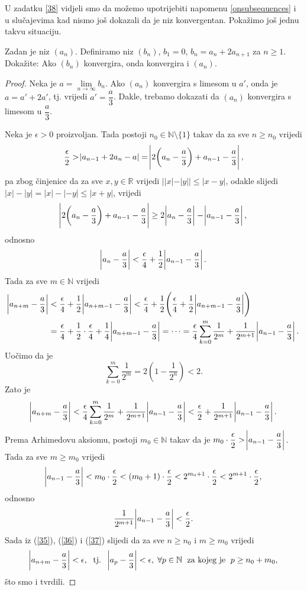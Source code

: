 U zadatku \ref{38} vidjeli smo da možemo upotrijebiti napomenu \ref{onsubsequences} i u slučajevima kad nismo još dokazali da je niz konvergentan. Pokažimo još jednu takvu situaciju.
\begin{exercise}
\label{iteration}
Zadan je niz $(a_n)$. Definiramo niz $(b_n)$, $b_1=0$, $b_n=a_{n}+2a_{n+1}$ za $n\geq 1$. Dokažite: Ako $(b_n)$ konvergira, onda konvergira i $(a_n)$.
\end{exercise}
\begin{proof}
Neka je $a=\lim\limits_{n\to \infty}{b_n}$. Ako $(a_n)$ konvergira s limesom u $a'$, onda je $a=a'+2a'$, tj. vrijedi $a'=\dfrac{a}{3}$. Dakle, trebamo dokazati da $(a_n)$ konvergira s limesom u $\dfrac{a}{3}$.

Neka je $\epsilon>0$ proizvoljan. Tada postoji $n_0\in \mathbb{N}\setminus\{1\}$ takav da za sve $n\geq n_0$ vrijedi
\begin{gather}
\label{35}
\dfrac{\epsilon}{2}>\abs{a_{n-1}+2a_n-a}=\abs{2\left(a_n-\dfrac{a}{3}\right)+a_{n-1}-\dfrac{a}{3}},
\end{gather}
pa zbog činjenice da za sve $x, y\in \mathbb{R}$ vrijedi $||x|-|y||\leq |x-y|$, odakle slijedi $|x|-|y|=|x|-|-y|\leq |x+y|$, vrijedi
$$\abs{2\left(a_n-\dfrac{a}{3}\right)+a_{n-1}-\dfrac{a}{3}}\geq 2\abs{a_n-\dfrac{a}{3}}-\abs{a_{n-1}-\dfrac{a}{3}},$$
odnosno
$$\abs{a_n-\dfrac{a}{3}}<\dfrac{\epsilon}{4}+\dfrac{1}{2}\abs{a_{n-1}-\dfrac{a}{3}}.$$
Tada za sve $m\in \mathbb{N}$ vrijedi
\begin{align*}
\abs{a_{n+m}-\dfrac{a}{3}}&<\dfrac{\epsilon}{4}+\dfrac{1}{2}\abs{a_{n+m-1}-\dfrac{a}{3}}<\dfrac{\epsilon}{4}+\dfrac{1}{2}\left(\dfrac{\epsilon}{4}+\dfrac{1}{2}\abs{a_{n+m-1}-\dfrac{a}{3}}\right)\\
&=\dfrac{\epsilon}{4}+\dfrac{1}{2}\cdot\dfrac{\epsilon}{4}+\dfrac{1}{4}\abs{a_{n+m-1}-\dfrac{a}{3}}=\dots=\dfrac{\epsilon}{4}\sum_{k=0}^m{\dfrac{1}{2^m}}+\dfrac{1}{2^{m+1}}\abs{a_{n-1}-\dfrac{a}{3}}.
\end{align*}
Uočimo da je $$\sum_{k=0}^m{\dfrac{1}{2^m}}=2\left(1-\dfrac{1}{2^n}\right)<2.$$
Zato je
\begin{gather}
\label{36}
\abs{a_{n+m}-\dfrac{a}{3}}<\dfrac{\epsilon}{4}\sum_{k=0}^m{\dfrac{1}{2^m}}+\dfrac{1}{2^{m+1}}\abs{a_{n-1}-\dfrac{a}{3}}<\dfrac{\epsilon}{2}+\dfrac{1}{2^{m+1}}\abs{a_{n-1}-\dfrac{a}{3}}.
\end{gather}
Prema Arhimedovu aksiomu, postoji $m_0\in \mathbb{N}$ takav da je $m_0\cdot\dfrac{\epsilon}{2}>\abs{a_{n-1}-\dfrac{a}{3}}$. Tada za sve $m\geq m_0$ vrijedi
$$\abs{a_{n-1}-\dfrac{a}{3}}<m_0\cdot\dfrac{\epsilon}{2}<(m_0+1)\cdot\dfrac{\epsilon}{2}<2^{m_0+1}\cdot\dfrac{\epsilon}{2}<2^{m+1}\cdot\dfrac{\epsilon}{2},$$
odnosno
\begin{gather}
\label{37}
\dfrac{1}{2^{m+1}}\abs{a_{n-1}-\dfrac{a}{3}}<\dfrac{\epsilon}{2}.
\end{gather}
Sada iz (\ref{35}), (\ref{36}) i (\ref{37}) slijedi da za sve $n\geq n_0$ i $m\geq m_0$ vrijedi
$$\abs{a_{n+m}-\dfrac{a}{3}}<\epsilon,\;\text{ tj. }\; \abs{a_{p}-\dfrac{a}{3}}<\epsilon,\; \forall p\in \mathbb{N}\;\text{ za kojeg je }\; p\geq n_0+m_0,$$
što smo i tvrdili.
\end{proof}
